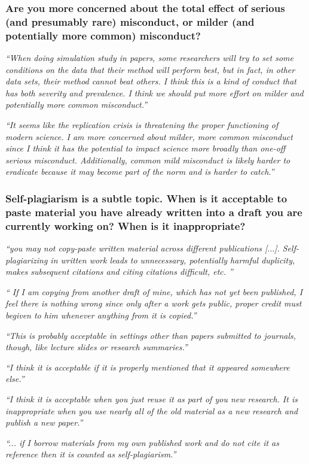 \documentclass[12pt]{beamer}
\newcommand\ans[1]{{\it ``#1''}}
\newcommand\gap{\vspace{5mm}}
\begin{document}
\begin{frame}
\frametitle{Are you more concerned about the total effect of serious (and presumably rare) misconduct, or milder (and potentially more common) misconduct?}


\ans{When doing simulation study in papers, some researchers will try to set some conditions on the data that their method will perform best, but in fact, in other data sets, their method cannot beat others.  I think this is a kind of conduct that has both severity and prevalence.  I think we should put more effort on milder and potentially more common misconduct.}

\end{frame}

\begin{frame}
\ans{It  seems  like  the  replication  crisis  is  threatening  the  proper  functioning  of  modern science.  I am more concerned about milder, more common misconduct since I think it has the potential to impact science more broadly than one-off serious misconduct. Additionally,  common  mild  misconduct  is  likely  harder  to  eradicate  because  it  may become part of the norm and is harder to catch.}
\end{frame}

\begin{frame}  %
  \frametitle{ Self-plagiarism is a subtle topic. When is it acceptable to paste material you have already written into a draft you are currently working on? When is it inappropriate?
}

\ans{you may not copy-paste written material across different publications [$\dots$].   Self-plagiarizing in written work leads to unnecessary, potentially harmful duplicity, makes subsequent citations and citing citations difficult, etc. }

\gap

\ans{ If I am copying from another draft of mine, which has not yet been published, I feel there is nothing wrong since only after a work gets public, proper credit must begiven to him whenever anything from it is copied.}

\end{frame}

\begin{frame}

\ans{This is probably acceptable  in  settings  other  than  papers  submitted  to  journals,  though,  like  lecture slides or research summaries.}

\gap

\ans{I think it is acceptable if it is properly mentioned that it appeared somewhere else.}

\gap

\ans{I  think  it  is  acceptable  when  you  just  reuse  it  as  part  of  you  new  research.   It  is inappropriate when you use nearly all of the old material as a new research and publish a new paper.}

\gap

\ans{... if I borrow materials from my own published work and do not cite it as reference then it is counted as self-plagiarism.}

\end{frame}
\end{document}
